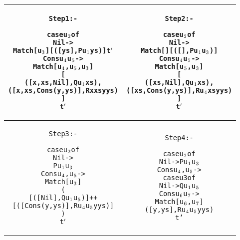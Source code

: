 \documentclass[11pt]{article}
\begin{document}
\begin{table}[h!]
\begin{center}
\begin{tabular}{|c|c|} \hline
\begin{minipage}{3.5in}
\begin{alltt}

Step 1 :-

case u\(\sb{2}\) of 
  Nil -> 
    Match [u\(\sb{3}\)] [([ys], P u\(\sb{1}\) ys)] t\(\sp{\prime}\) 
  Cons u\(\sb{4}\) u\(\sb{5}\) -> 
    Match [u\(\sb{4}\),u\(\sb{5}\),u\(\sb{3}\)]
      [
        ([x,xs,Nil],       Q u\(\sb{1}\) xs),
        ([x,xs,Cons(y,ys)],R x xs y ys)
      ]
      t\(\sp{\prime}\) 


\end{alltt} 
\end {minipage} &
\begin{minipage}{3.5in}
\begin{alltt}

Step 2 :-

case u\(\sb{2}\) of 
  Nil -> 
    Match [] [([], P u\(\sb{1}\) u\(\sb{3}\) )]
  Cons u\(\sb{4}\) u\(\sb{5}\) -> 
    Match [u\(\sb{5}\),u\(\sb{3}\)]
      [
        ([xs,Nil],       Q u\(\sb{1}\) xs),
        ([xs,Cons(y,ys)],R u\(\sb{4}\) xs y ys)
      ]
      t\(\sp{\prime}\) 

\end{alltt} 
\end {minipage}\\ 
\hline 
\begin{minipage}{3.5in}
\begin{alltt}

Step 3 :-

case u\(\sb{2}\) of 
  Nil -> 
    P u\(\sb{1}\) u\(\sb{3}\) 
  Cons u\(\sb{4}\),u\(\sb{5}\) -> 
    Match [u\(\sb{3}\)]
      (
       [([Nil],       Q u\(\sb{1}\) u\(\sb{5}\))] ++
       [([Cons(y,ys)],R u\(\sb{4}\) u\(\sb{5}\) y ys)]
      )
      t\(\sp{\prime}\)

\end{alltt} 
\end {minipage} &
\begin{minipage}{3.5in}
\begin{alltt}

Step 4 :-

case u\(\sb{2}\) of 
  Nil -> P u\(\sb{1}\) u\(\sb{3}\)
  Cons u\(\sb{4}\),u\(\sb{5}\) -> 
    case u3 of 
      Nil -> Q u\(\sb{1}\) u\(\sb{5}\)
      Cons u\(\sb{6}\) u\(\sb{7}\) -> 
        Match [u\(\sb{6}\), u\(\sb{7}\)]
              ([y,ys],R u\(\sb{4}\) u\(\sb{5}\) y ys)
              t' 



\end{alltt}
\end{minipage}
\end{tabular}
\end{center}
\end{table}
\end{document}
